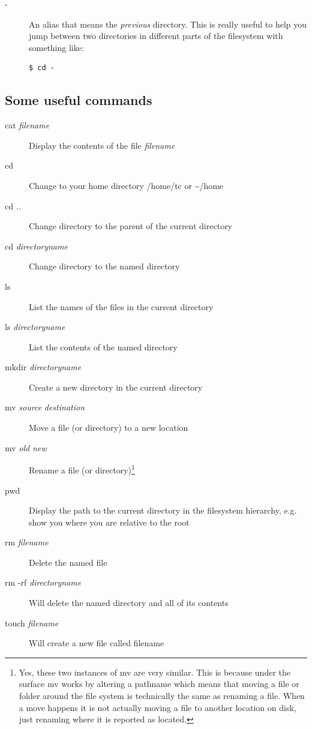 \documentclass[12pt, a4paper, oneside]{book}
\begin{document}
{\begin{description}
\item[-] An alias that means the \emph{previous} directory. This is really useful to help you jump between two directories in different parts of the filesystem with something like:
\begin{lstlisting}[style=DOS]
    $ cd -
\end{lstlisting}

\end{description}

\subsection{Some useful commands}
\begin{description}
\item[cat \emph{filename}] Display the contents of the file \emph{filename}
\item[cd] Change to your home directory /home/tc or \textasciitilde/home
\item[cd \emph{..}] Change directory to the parent of the current directory
\item[cd \emph{directoryname}] Change directory to the named directory
\item[ls] List the names of the files in the current directory
\item[ls  \emph{directoryname}] List the contents of the named directory
\item[mkdir \emph{directoryname}] Create a new directory in the current directory
\item[mv \emph{source} \emph{destination}] Move a file (or directory) to a new location
\item[mv \emph{old} \emph{new}] Rename a file (or directory)\footnote{Yes, these two instances of mv are very similar. This is because under the surface mv works by altering a pathname which means that moving a file or folder around the file system is technically the same as renaming a file. When a move happens it is not actually moving a file to another location on disk, just renaming where it is reported as located.}
\item[pwd] Display the path to the current directory in the filesystem hierarchy, e.g. show you where you are relative to the root
\item[rm \emph{filename}] Delete the named file
\item[rm -rf \emph{directoryname}] Will delete the named directory and all of its contents
\item[touch \emph{filename}] Will create a new file called filename
\end{description}

}
\end{document}

